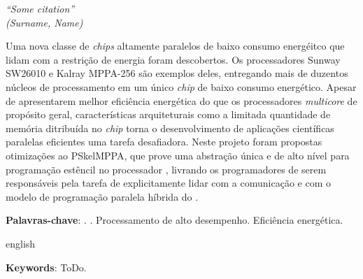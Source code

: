 \documentclass[a5paper]{ufsc-thesis}
\begin{document}
\begin{agradecimentos}
\end{agradecimentos}

\begin{epigrafe}
    \vspace*{\fill}
	\begin{flushright}
		\textit{``Some citation''\\
		(Surname, Name)}
	\end{flushright}
\end{epigrafe}



\setlength{\absparsep}{18pt} %
\begin{resumo}
	Uma nova classe de \emph{chips} altamente paralelos de baixo consumo energéitco que lidam com a restrição de energia foram descobertos. Os processadores Sunway SW26010 e Kalray MPPA-256 são exemplos deles, entregando mais de duzentos núcleos de processamento em um único \emph{chip} de baixo consumo energético. Apesar de apresentarem melhor eficiência energética do que os processadores \emph{multicore} de propósito geral, características arquiteturais como a limitada quantidade de memória ditribuída no \emph{chip} torna o desenvolvimento de aplicações científicas paralelas eficientes uma tarefa desafiadora. Neste projeto foram propostas otimizações ao \fw PSkelMPPA, que prove uma abstração única e de alto nível para programação estêncil no processador \mppa, livrando os programadores de serem responsáveis pela tarefa de explicitamente lidar com a comunicação e com o modelo de programação paralela híbrida do \mppa.

	\textbf{Palavras-chave}: \Manycore. \mppa. Processamento de alto desempenho. Eficiência energética.
\end{resumo}

\begin{resumo}[Abstract]
	\begin{otherlanguage*}{english}

   		\vspace{\onelineskip}
 
   \noindent 
   \textbf{Keywords}: ToDo.
 \end{otherlanguage*}
\end{resumo}
\end{document}
